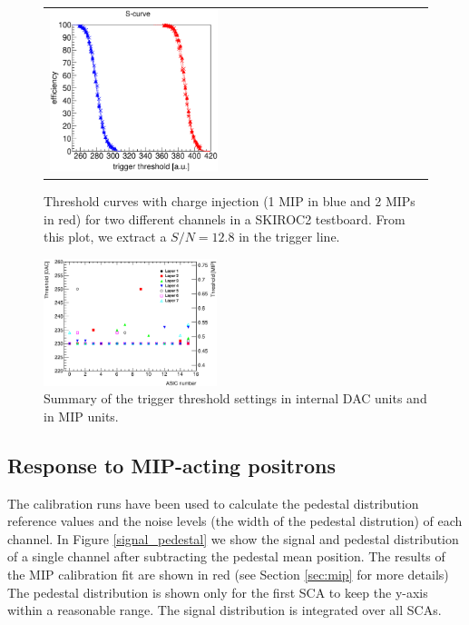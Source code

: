 \documentclass[final,3p,times,twocolumn]{elsarticle}
\begin{document}
\begin{figure}[!t]
    \centering
  \begin{tabular}{l}
	\includegraphics[width=0.45\textwidth]{../figs/commissioning/scurve_pp_fastshaper_ch_au.eps} \\
	\end{tabular}
\caption{Threshold curves with charge injection (1 MIP in blue and 2 MIPs in red) for two different channels in a SKIROC2 testboard. From this plot, we extract a $S/N = 12.8$ in the trigger line.}
\label{scurves_injection}
\end{figure}

\begin{figure}[!t]
  \centering
  \includegraphics[width=0.45\textwidth]{../figs/commissioning/threshold_chip.eps}
  \caption{Summary of the trigger threshold settings in internal DAC units and in MIP units.}
\label{trigger_thresholds}
\end{figure}



\subsection{Response to MIP-acting positrons}
\label{sec:calib}

The calibration runs have been used to calculate the pedestal distribution reference values 
and the noise levels (the width of the pedestal distrution) of each channel.
In Figure \ref{signal_pedestal} we show the signal and pedestal distribution of a single channel after
subtracting the pedestal mean position. The results of the MIP calibration fit are shown in red (see Section \ref{sec:mip} for more details)
The pedestal distribution is shown only for the first SCA to keep the y-axis within a reasonable range.
The signal distribution is integrated over all SCAs.
\end{document}
